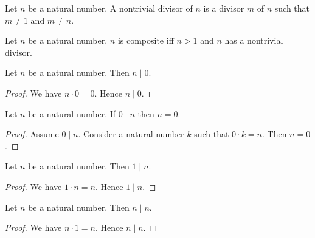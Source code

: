 \documentclass[10pt]{article}
\begin{document}
  \begin{forthel}
    \begin{definition}[id=ARITHMETIC_10_8768240253665280,printid]
      Let $n$ be a natural number.
      A nontrivial divisor of $n$ is a divisor $m$ of $n$ such that $m \neq 1$ and $m \neq n$.
    \end{definition}
  \end{forthel}

  \begin{forthel}
    \begin{definition}[id=ARITHMETIC_10_8020087063707648,printid]
      Let $n$ be a natural number.
      $n$ is composite iff $n > 1$ and $n$ has a nontrivial divisor.
    \end{definition}
  \end{forthel}

  \begin{forthel}
    \begin{proposition}[id=ARITHMETIC_07_2242720387039232,printid]
      Let $n$ be a natural number.
      Then $n \mid 0$.
    \end{proposition}
    \begin{proof}
      We have $n \cdot 0 = 0$.
      Hence $n \mid 0$.
    \end{proof}
  \end{forthel}

  \begin{forthel}
    \begin{proposition}[id=ARITHMETIC_07_8611150130315264,printid]
      Let $n$ be a natural number.
      If $0 \mid n$ then $n = 0$.
    \end{proposition}
    \begin{proof}
      Assume $0 \mid n$.
      Consider a natural number $k$ such that $0 \cdot k = n$.
      Then $n = 0$.
    \end{proof}
  \end{forthel}

  \begin{forthel}
    \begin{proposition}[id=ARITHMETIC_07_1259086070939648,printid]
      Let $n$ be a natural number.
      Then $1 \mid n$.
    \end{proposition}
    \begin{proof}
      We have $1 \cdot n = n$.
      Hence $1 \mid n$.
    \end{proof}
  \end{forthel}

  \begin{forthel}
    \begin{proposition}[id=ARITHMETIC_07_3944887330275328,printid]
      Let $n$ be a natural number.
      Then $n \mid n$.
    \end{proposition}
    \begin{proof}
      We have $n \cdot 1 = n$.
      Hence $n \mid n$.
    \end{proof}
  \end{forthel}
\end{document}
